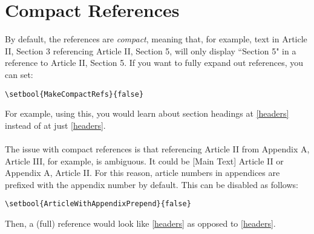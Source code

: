 \documentclass{constitution}
\begin{document}
\section{Compact References}
By default, the references are \textit{compact}, meaning that, for example, text in Article II, Section 3 referencing Article II, Section 5, will only display ``Section 5" in a reference to Article II, Section 5.
If you want to fully expand out references, you can set:\par
\quad \verb|\setbool{MakeCompactRefs}{false}|\par
{}
For example, using this, you would learn about section headings at \ref{headers}
instead of at just
%
\ref{headers}.
\\\\
The issue with compact references is that referencing Article II from Appendix A, Article III, for example, is ambiguous.
It could be [Main Text] Article II or Appendix A, Article II.
For this reason, article numbers in appendices are prefixed with the appendix number by default.
This can be disabled as follows:\par
\quad \verb|\setbool{ArticleWithAppendixPrepend}{false}|\par
{}
Then, a (full) reference would look like
%
\ref{headers} as opposed to
%
\ref{headers}.
\end{document}
